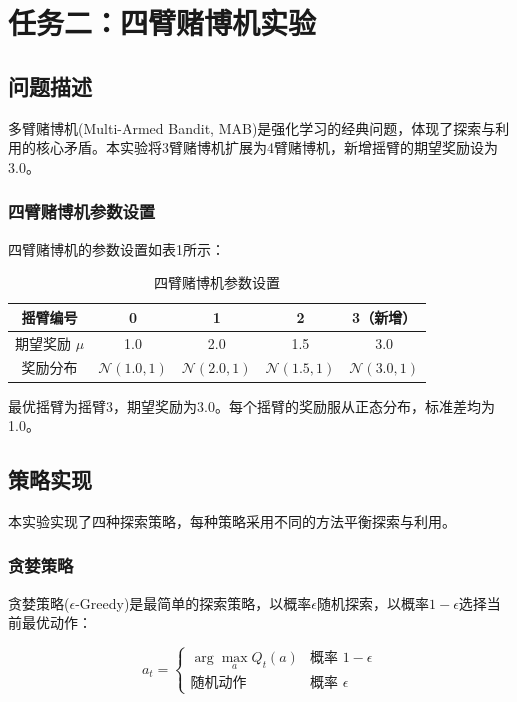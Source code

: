 \documentclass[12pt,a4paper]{article}
\begin{document}
\section{任务二：四臂赌博机实验}

\subsection{问题描述}

多臂赌博机(Multi-Armed Bandit, MAB)是强化学习的经典问题，体现了探索与利用的核心矛盾。本实验将3臂赌博机扩展为4臂赌博机，新增摇臂的期望奖励设为3.0。

\subsubsection{四臂赌博机参数设置}

四臂赌博机的参数设置如表1所示：

\begin{table}[H]
\centering
\caption{四臂赌博机参数设置}
\begin{tabular}{ccccc}
\toprule
摇臂编号 & 0 & 1 & 2 & 3（新增）\\
\midrule
期望奖励 $\mu$ & 1.0 & 2.0 & 1.5 & 3.0 \\
奖励分布 & $\mathcal{N}(1.0, 1)$ & $\mathcal{N}(2.0, 1)$ & $\mathcal{N}(1.5, 1)$ & $\mathcal{N}(3.0, 1)$ \\
\bottomrule
\end{tabular}
\end{table}

最优摇臂为摇臂3，期望奖励为3.0。每个摇臂的奖励服从正态分布，标准差均为1.0。

\subsection{策略实现}

本实验实现了四种探索策略，每种策略采用不同的方法平衡探索与利用。

\subsubsection{贪婪策略}

贪婪策略($\epsilon$-Greedy)是最简单的探索策略，以概率$\epsilon$随机探索，以概率$1-\epsilon$选择当前最优动作：

\begin{equation}
a_t = 
\begin{cases}
\arg\max_a Q_t(a) & \text{概率 } 1-\epsilon\\
\text{随机动作} & \text{概率 } \epsilon
\end{cases}
\end{equation}
\end{document}

